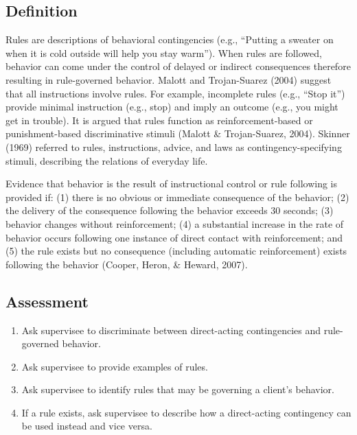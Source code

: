 \subsection{Definition}
Rules are descriptions of behavioral contingencies (e.g., ``Putting a sweater on when it is cold outside will help you stay warm'').  When rules are followed, behavior can come under the control of delayed or indirect consequences therefore resulting in rule-governed behavior.  Malott and Trojan-Suarez (2004) suggest that all instructions involve rules.  For example, incomplete rules (e.g., ``Stop it'') provide minimal instruction (e.g., stop) and imply an outcome (e.g., you might get in trouble).   It is argued that rules function as reinforcement-based or punishment-based discriminative stimuli (Malott \& Trojan-Suarez, 2004). Skinner (1969) referred to rules, instructions, advice, and laws as contingency-specifying stimuli, describing the  relations of everyday life.

Evidence that behavior is the result of instructional control or rule following is provided if: (1) there is no obvious or immediate consequence of the behavior; (2) the delivery of the consequence following the behavior exceeds 30 seconds; (3) behavior changes without reinforcement; (4) a substantial increase in the rate of behavior occurs following one instance of direct contact with reinforcement; and (5) the rule exists but no consequence (including automatic reinforcement) exists following the behavior (Cooper, Heron, \& Heward, 2007).
%
\subsection{Assessment}
\begin{enumerate}
\item Ask supervisee to discriminate between direct-acting contingencies and rule-governed behavior.
\item Ask supervisee to provide examples of rules.
\item Ask supervisee to identify rules that may be governing a client's behavior.
\item If a rule exists, ask supervisee to describe how a direct-acting contingency can be used instead and vice versa.
\end{enumerate}
%
